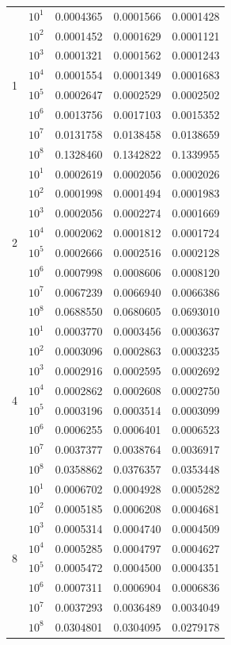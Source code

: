 \documentclass[11pt,a4paper]{article}
\begin{document}
\begin{longtable}{ccrrr}
\multirow{8}{*}{1} 
 & $10^1$ & 0.0004365 & 0.0001566 & 0.0001428 \\
 & $10^2$ & 0.0001452 & 0.0001629 & 0.0001121 \\
 & $10^3$ & 0.0001321 & 0.0001562 & 0.0001243 \\
 & $10^4$ & 0.0001554 & 0.0001349 & 0.0001683 \\
 & $10^5$ & 0.0002647 & 0.0002529 & 0.0002502 \\
 & $10^6$ & 0.0013756 & 0.0017103 & 0.0015352 \\
 & $10^7$ & 0.0131758 & 0.0138458 & 0.0138659 \\
 & $10^8$ & 0.1328460 & 0.1342822 & 0.1339955 \\ \hline
\multirow{8}{*}{2} 
 & $10^1$ & 0.0002619 & 0.0002056 & 0.0002026 \\
 & $10^2$ & 0.0001998 & 0.0001494 & 0.0001983 \\
 & $10^3$ & 0.0002056 & 0.0002274 & 0.0001669 \\
 & $10^4$ & 0.0002062 & 0.0001812 & 0.0001724 \\
 & $10^5$ & 0.0002666 & 0.0002516 & 0.0002128 \\
 & $10^6$ & 0.0007998 & 0.0008606 & 0.0008120 \\
 & $10^7$ & 0.0067239 & 0.0066940 & 0.0066386 \\
 & $10^8$ & 0.0688550 & 0.0680605 & 0.0693010 \\ \hline
\multirow{8}{*}{4} 
 & $10^1$ & 0.0003770 & 0.0003456 & 0.0003637 \\
 & $10^2$ & 0.0003096 & 0.0002863 & 0.0003235 \\
 & $10^3$ & 0.0002916 & 0.0002595 & 0.0002692 \\
 & $10^4$ & 0.0002862 & 0.0002608 & 0.0002750 \\
 & $10^5$ & 0.0003196 & 0.0003514 & 0.0003099 \\
 & $10^6$ & 0.0006255 & 0.0006401 & 0.0006523 \\
 & $10^7$ & 0.0037377 & 0.0038764 & 0.0036917 \\
 & $10^8$ & 0.0358862 & 0.0376357 & 0.0353448 \\ \hline
\multirow{8}{*}{8} 
 & $10^1$ & 0.0006702 & 0.0004928 & 0.0005282 \\
 & $10^2$ & 0.0005185 & 0.0006208 & 0.0004681 \\
 & $10^3$ & 0.0005314 & 0.0004740 & 0.0004509 \\
 & $10^4$ & 0.0005285 & 0.0004797 & 0.0004627 \\
 & $10^5$ & 0.0005472 & 0.0004500 & 0.0004351 \\
 & $10^6$ & 0.0007311 & 0.0006904 & 0.0006836 \\
 & $10^7$ & 0.0037293 & 0.0036489 & 0.0034049 \\
 & $10^8$ & 0.0304801 & 0.0304095 & 0.0279178 \\
\end{longtable}
\end{document}
